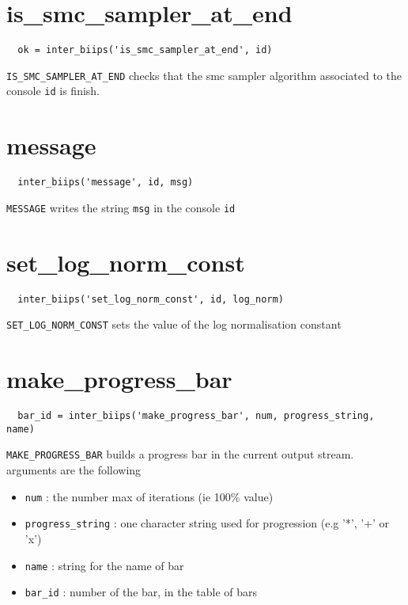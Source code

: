 \documentclass[11pt,twoside]{article}
\begin{document}
\section{is\_smc\_sampler\_at\_end}

 \begin{lstlisting} 
  ok = inter_biips('is_smc_sampler_at_end', id)
 \end{lstlisting}
 \texttt{IS\_SMC\_SAMPLER\_AT\_END} checks that the smc sampler algorithm associated to the console \texttt{id} is finish.


\section{message}
 
 \begin{lstlisting} 
  inter_biips('message', id, msg)
 \end{lstlisting}

  \texttt{MESSAGE} writes the string \texttt{msg} in the console \texttt{id}

\section{set\_log\_norm\_const}

 \begin{lstlisting} 
  inter_biips('set_log_norm_const', id, log_norm)
 \end{lstlisting}
  
  \texttt{SET\_LOG\_NORM\_CONST} sets the value of the log normalisation constant

\section{make\_progress\_bar}

 \begin{lstlisting} 
  bar_id = inter_biips('make_progress_bar', num, progress_string, name)
 \end{lstlisting}

 \texttt{MAKE\_PROGRESS\_BAR} builds a progress bar in the current output stream. arguments are the following
 \begin{itemize}
  \item \texttt{num} : the number max of iterations (ie 100\% value)
  \item \texttt{progress\_string} : one character string used for progression (e.g '*', '+' or 'x')
  \item \texttt{name} : string for the name of bar
  \item \texttt{bar\_id} : number of the bar, in the table of bars
  \end{itemize}
\end{document}
